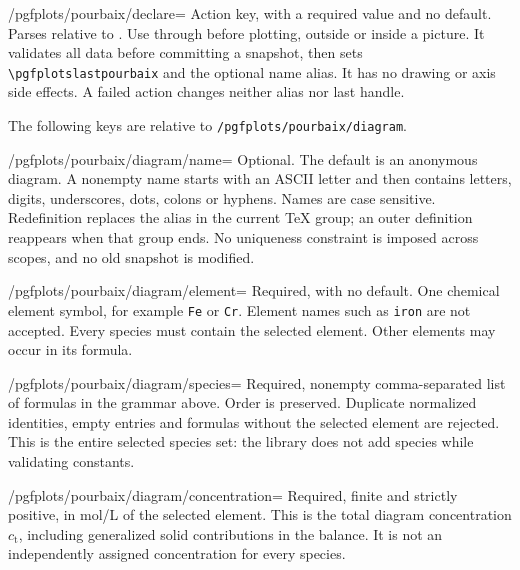 \documentclass[a4paper,11pt]{ltxdoc}
\begin{document}
\begin{key}{/pgfplots/pourbaix/declare=}
Action key, with a required value and no default. Parses  relative
to . Use through  before
plotting, outside or inside a picture. It validates all data before committing
a snapshot, then sets \verb|\pgfplotslastpourbaix| and the optional name alias.
It has no drawing or axis side effects. A failed action changes neither alias
nor last handle.
\end{key}

The following keys are relative to \texttt{/pgfplots/pourbaix/diagram}.
\begin{key}{/pgfplots/pourbaix/diagram/name=}
Optional. The default is an anonymous diagram. A nonempty name starts with an
ASCII letter and then contains letters, digits, underscores, dots, colons or
hyphens. Names are case sensitive. Redefinition replaces the alias in the current
TeX group; an outer definition reappears when that group ends. No uniqueness
constraint is imposed across scopes, and no old snapshot is modified.
\end{key}
\begin{key}{/pgfplots/pourbaix/diagram/element=}
Required, with no default. One chemical element symbol, for example \texttt{Fe}
or \texttt{Cr}. Element names such as \texttt{iron} are not accepted. Every species
must contain the selected element. Other elements may occur in its formula.
\end{key}
\begin{key}{/pgfplots/pourbaix/diagram/species=}
Required, nonempty comma-separated list of formulas in the grammar above.
Order is preserved. Duplicate normalized identities, empty entries and formulas
without the selected element are rejected. This is the entire selected species
set: the library does not add species while validating constants.
\end{key}
\begin{key}{/pgfplots/pourbaix/diagram/concentration=}
Required, finite and strictly positive, in mol/L of the selected element.
This is the total diagram concentration $c_{\mathrm t}$, including generalized
solid contributions in the balance. It is not an independently assigned
concentration for every species.
\end{key}
\end{document}
